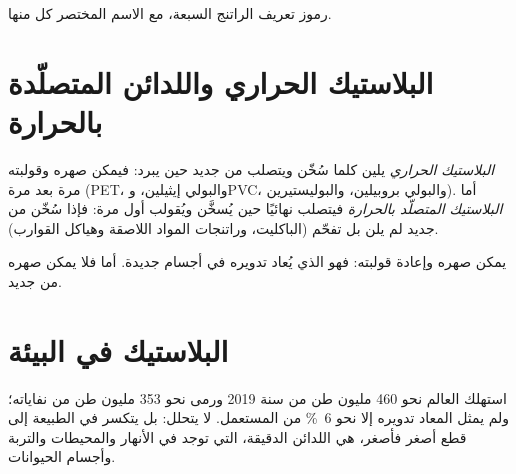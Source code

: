 \begin{omfigure}

{\small رموز تعريف الراتنج السبعة، مع الاسم المختصر  كل
منها.}
\end{omfigure}

\section{البلاستيك الحراري واللدائن المتصلّدة بالحرارة}

\begin{definition}\label{def:g8:plastics:thermoplastic}
\emph{البلاستيك الحراري} يلين كلما سُخّن ويتصلب من
جديد حين يبرد: فيمكن صهره وقولبته مرة بعد مرة (PET، والبولي إيثيلين،
وPVC، والبولي بروبيلين، والبوليستيرين). أما
\emph{البلاستيك المتصلّد بالحرارة} فيتصلب
نهائيًا حين يُسخَّن ويُقولب أول مرة: فإذا سُخّن من جديد لم يلن بل تفحّم
(الباكليت، وراتنجات المواد اللاصقة وهياكل القوارب).
\end{definition}

\begin{remark}\label{rem:g8:plastics:which}
 يمكن صهره وإعادة قولبته: فهو  الذي يُعاد تدويره
في أجسام جديدة. أما  فلا يمكن صهره من جديد.
\end{remark}

\section{البلاستيك في البيئة}

\begin{proposition}\label{prop:g8:plastics:last}
استهلك العالم نحو 460 مليون طن من  سنة 2019 ورمى نحو 353
مليون طن من نفاياته؛ ولم يمثل  المعاد تدويره إلا نحو
\qty{6}{\percent} من  المستعمل.  لا يتحلل: بل يتكسر في
الطبيعة إلى قطع أصغر فأصغر، هي اللدائن الدقيقة، التي توجد في الأنهار
والمحيطات والتربة وأجسام الحيوانات.
\end{proposition}


